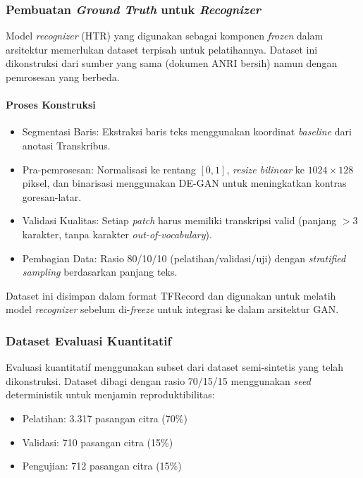 \documentclass[12pt,a4paper]{article}
\begin{document}
\subsubsection{Pembuatan \textit{Ground Truth} untuk \textit{Recognizer}}
\label{subsec:implementasi-pipeline}

Model \textit{recognizer} (HTR) yang digunakan sebagai komponen \textit{frozen} dalam arsitektur memerlukan dataset terpisah untuk pelatihannya. Dataset ini dikonstruksi dari sumber yang sama (dokumen ANRI bersih) namun dengan pemrosesan yang berbeda.

\paragraph{Proses Konstruksi}
\begin{itemize}[leftmargin=1.5em, labelsep=0.5em, noitemsep, topsep=0pt]
  \item Segmentasi Baris: Ekstraksi baris teks menggunakan koordinat \textit{baseline} dari anotasi Transkribus.
  \item Pra-pemrosesan: Normalisasi ke rentang $[0,1]$, \textit{resize bilinear} ke $1024 \times 128$ piksel, dan binarisasi menggunakan DE-GAN untuk meningkatkan kontras goresan-latar.
  \item Validasi Kualitas: Setiap \textit{patch} harus memiliki transkripsi valid (panjang $> 3$ karakter, tanpa karakter \textit{out-of-vocabulary}).
  \item Pembagian Data: Rasio 80/10/10 (pelatihan/validasi/uji) dengan \textit{stratified sampling} berdasarkan panjang teks.
\end{itemize}

Dataset ini disimpan dalam format TFRecord dan digunakan untuk melatih model \textit{recognizer} sebelum di-\textit{freeze} untuk integrasi ke dalam arsitektur GAN.

\subsubsection{Dataset Evaluasi Kuantitatif}

Evaluasi kuantitatif menggunakan subset dari dataset semi-sintetis yang telah dikonstruksi. Dataset dibagi dengan rasio 70/15/15 menggunakan \textit{seed} deterministik untuk menjamin reproduktibilitas:
\begin{itemize}[leftmargin=1.5em, labelsep=0.5em, noitemsep, topsep=0pt]
  \item Pelatihan: 3.317 pasangan citra (70\%)
  \item Validasi: 710 pasangan citra (15\%)
  \item Pengujian: 712 pasangan citra (15\%)
\end{itemize}
\end{document}
